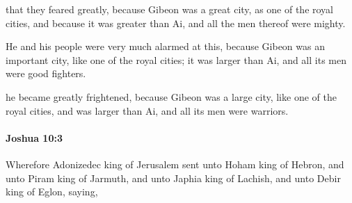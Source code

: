 			\begin{versebox}
					\item[BHS] 
					\item[ASV] that they feared greatly, because Gibeon was a great city, as one of the royal cities, and because it was greater than Ai, and all the men thereof were mighty.
					\item[NIV] He and his people were very much alarmed at this, because Gibeon was an important city, like one of the royal cities; it was larger than Ai, and all its men were good fighters.
					\item[NRSV] he became greatly frightened, because Gibeon was a large city, like one of the royal cities, and was larger than Ai, and all its men were warriors.
			\end{versebox}

		\paragraph{Joshua 10:3} %
			\label{JOSHUA-10-3}

			Wherefore Adonizedec king of Jerusalem sent unto Hoham king of Hebron, and unto Piram king of Jarmuth, and unto Japhia king of Lachish, and unto Debir king of Eglon, saying,

